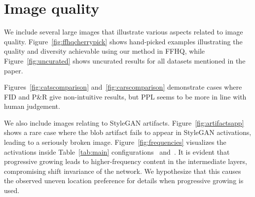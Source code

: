 \ifarxiv
	\newcommand{\refsecin}{Section~\ref{sec:in}}
	\newcommand{\reffigarch}{Figure~\ref{fig:arch}}
	\newcommand{\reffigGDarch}{Figure~\ref{fig:GDarch}}
	\newcommand{\refeqmodulation}{Equation~\ref{eq:modulation}}
	\newcommand{\refeqdemodulation}{Equation~\ref{eq:demodulation}}
	\newcommand{\refeqmodem}{Equations \ref{eq:modulation} and \ref{eq:demodulation}}
	\newcommand{\refseclazyreg}{Section~\ref{sec:lazyreg}}
	\newcommand{\refsecpathreg}{Section~\ref{sec:pathreg}}
	\newcommand{\refsecaltarch}{Section~\ref{sec:altarch}}
	\newcommand{\reftabmain}{Table~\ref{tab:main}}
	\newcommand{\reftabmains}{Tables \ref{tab:main} and \ref{tab:lsun}}
\else
	\newcommand{\refsecin}{Section~2 of the paper}
	\newcommand{\reffigarch}{Figure~1 of the paper}
	\newcommand{\reffigGDarch}{Figure~7 of the paper}
	\newcommand{\refeqmodulation}{Equation~1 of the paper}
	\newcommand{\refeqdemodulation}{Equation~3 of the paper}
	\newcommand{\refeqmodem}{Equations 1 and 3 of the paper}
	\newcommand{\refseclazyreg}{Section~3.1 of the paper}
	\newcommand{\refsecpathreg}{Section~3.2 of the paper}
	\newcommand{\refsecaltarch}{Section~4.1 of the paper}
	\newcommand{\reftabmain}{Table~1 of the paper}
	\newcommand{\reftabmains}{Tables~1 and~3 of the paper}
	\newcommand{\reftablsun}{Table~3 of the paper}
\fi

\section{Image quality} %
\label{app:imagequality}

\figffhqcherrypick %
\figuncurated %
\figcatscomparison %
\figcarscomparison %
\figartifactsapp
\figfrequencies

We include several large images that illustrate various aspects related to image quality.
Figure~\ref{fig:ffhqcherrypick} shows hand-picked examples illustrating the quality and diversity achievable using our method in \textsc{FFHQ}, while
Figure~\ref{fig:uncurated} shows uncurated results for all datasets mentioned in the paper.

Figures~\ref{fig:catscomparison} and~\ref{fig:carscomparison} demonstrate cases where FID and P\&R give non-intuitive results, but PPL seems to be more in line with human judgement.

We also include images relating to StyleGAN artifacts.
Figure~\ref{fig:artifactsapp} shows a rare case where the blob artifact fails to appear in StyleGAN activations, leading to a seriously broken image.
Figure~\ref{fig:frequencies} visualizes the activations inside \reftabmain{} configurations~ and~. It is evident that progressive growing leads to higher-frequency content in the intermediate layers, compromising shift invariance of the network. We hypothesize that this causes the observed uneven location preference for details when progressive growing is used.


